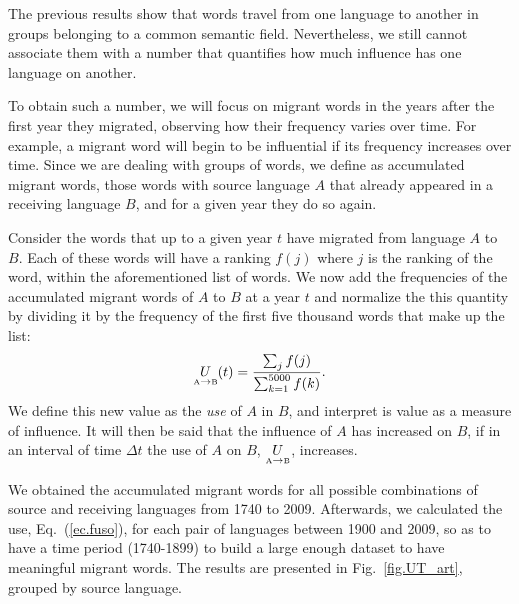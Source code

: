 \documentclass[10pt,letterpaper]{article} %
\newcommand{\eref}[1]{Eq.~(\ref{#1})}
\newcommand{\fref}[1]{Fig.~\ref{#1}}
\begin{document}
The previous results show that words travel from one language to another in
groups belonging to a common semantic field. Nevertheless, we still cannot
associate them with a number that quantifies how much influence has one
language on another.

To obtain such a number, we will focus on migrant words in the years after the
first year they migrated, observing how their frequency varies over time. For
example, a migrant word will begin to be influential if its frequency increases
over time. Since we are dealing with groups of words, we define as accumulated
migrant words, those words with source language $A$ that already appeared in a
receiving language $B$, and for a given year they do so again.


Consider the words that up to a given year $t$ have migrated from language $A$ to $B$. Each of these
words will have a ranking $f(j)$ where $j$ is the ranking of the word, within the aforementioned
list of words. 
% 
We now
add the frequencies of the accumulated
migrant words of $A$ to $B$ at a year $t$ and normalize the this quantity by
dividing it by the frequency of the first five thousand words that make up the list:
\begin{equation}
\label{ec.fuso}
\underset{ \text{\tiny A} \to  \text{\tiny B} }{U}(t) = \frac{\sum_{j}
f(j)}{\sum_{k=1}^{5000} f(k)}.
\end{equation}
We define this new value as the \textit{use} of $A$ in $B$, and interpret is value
as a measure of influence. It will then be said that the influence of $A$ has increased on
$B$, if in an interval of time $\Delta t$ the use of $A$ on $B$, $\underset{ \text{\tiny A} \to  \text{\tiny B} }{U}$, increases.

We obtained the accumulated migrant words for all possible combinations of
source and receiving languages from 1740 to 2009.  Afterwards, we calculated
the use, \eref{ec.fuso},  for each pair of languages between 1900 and 2009, so
as to have a time period (1740-1899) to build a large enough dataset to have
meaningful migrant words. The results are presented in \fref{fig.UT_art}, 
grouped by source language. 


% 
\end{document}
